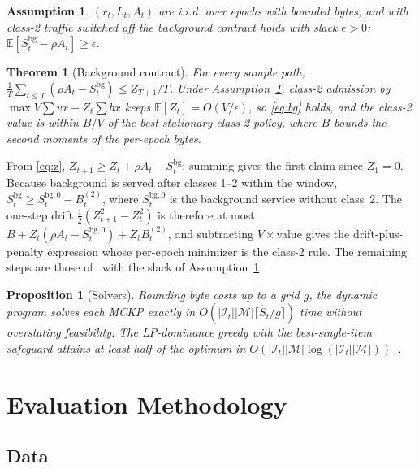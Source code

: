 \documentclass[journal]{IEEEtran}
\newtheorem{theorem}{Theorem}
\newtheorem{proposition}{Proposition}
\newtheorem{assumption}{Assumption}
\theoremstyle{remark}
\begin{document}
\begin{assumption}\label{ass:slater}
$(r_t,L_t,A_t)$ are i.i.d. over epochs with bounded bytes, and with class-2 traffic switched off the background contract holds with slack $\epsilon>0$: $\mathbb E[S^{\mathrm{bg}}_t-\rho A_t]\ge\epsilon$.
\end{assumption}
\begin{theorem}[Background contract]\label{thm:dpp}
For every sample path, $\frac1T\sum_{t\le T}(\rho A_t-S^{\mathrm{bg}}_t)\le Z_{T+1}/T$. Under Assumption~\ref{ass:slater}, class-2 admission by $\max V\sum v x-Z_t\sum b x$ keeps $\mathbb E[Z_t]=O(V/\epsilon)$, so \eqref{eq:bg} holds, and the class-2 value is within $B/V$ of the best stationary class-2 policy, where $B$ bounds the second moments of the per-epoch bytes.
\end{theorem}
\begin{IEEEproof}
From \eqref{eq:z}, $Z_{t+1}\ge Z_t+\rho A_t-S^{\mathrm{bg}}_t$; summing gives the first claim since $Z_1=0$. Because background is served after classes 1--2 within the window, $S^{\mathrm{bg}}_t\ge S^{\mathrm{bg},0}_t-B^{(2)}_t$, where $S^{\mathrm{bg},0}_t$ is the background service without class~2. The one-step drift $\frac12(Z_{t+1}^2-Z_t^2)$ is therefore at most $B+Z_t(\rho A_t-S^{\mathrm{bg},0}_t)+Z_tB^{(2)}_t$, and subtracting $V\times$value gives the drift-plus-penalty expression whose per-epoch minimizer is the class-2 rule. The remaining steps are those of~\cite[Thm.~4.8]{neely2010book} with the slack of Assumption~\ref{ass:slater}.
\end{IEEEproof}

\begin{proposition}[Solvers]\label{prop:solver}
Rounding byte costs up to a grid $g$, the dynamic program solves each MCKP exactly in $O(|\mathcal I_t||\mathcal M|\lceil \hat S_t/g\rceil)$ time without overstating feasibility. The LP-dominance greedy with the best-single-item safeguard attains at least half of the optimum in $O(|\mathcal I_t||\mathcal M|\log(|\mathcal I_t||\mathcal M|))$~\cite{sinha1979mckp,kellerer2004knapsack}.
\end{proposition}

\section{Evaluation Methodology}\label{sec:setup}
\subsection{Data}
\end{document}
